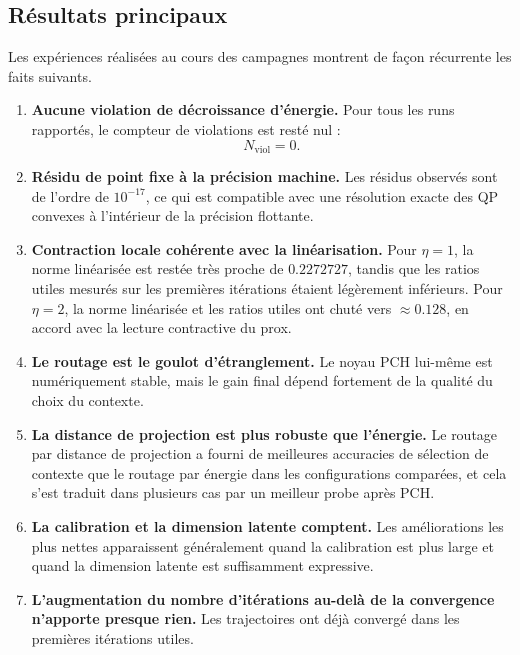\documentclass[11pt,a4paper]{article}
\newcommand{\1}{\mathbf 1}
\begin{document}
\subsection{Résultats principaux}

Les expériences réalisées au cours des campagnes montrent de façon récurrente les faits suivants.

\begin{enumerate}[leftmargin=2em]
    \item \textbf{Aucune violation de décroissance d’énergie.}
    Pour tous les runs rapportés, le compteur de violations est resté nul :
    \[
    N_{\mathrm{viol}} = 0.
    \]

    \item \textbf{Résidu de point fixe à la précision machine.}
    Les résidus observés sont de l’ordre de \(10^{-17}\), ce qui est compatible avec une résolution exacte des QP convexes à l’intérieur de la précision flottante.

    \item \textbf{Contraction locale cohérente avec la linéarisation.}
    Pour \(\eta=1\), la norme linéarisée est restée très proche de \(0.2272727\), tandis que les ratios utiles mesurés sur les premières itérations étaient légèrement inférieurs.
    Pour \(\eta=2\), la norme linéarisée et les ratios utiles ont chuté vers \(\approx 0.128\), en accord avec la lecture contractive du prox.

    \item \textbf{Le routage est le goulot d’étranglement.}
    Le noyau PCH lui-même est numériquement stable, mais le gain final dépend fortement de la qualité du choix du contexte.

    \item \textbf{La distance de projection est plus robuste que l’énergie.}
    Le routage par distance de projection a fourni de meilleures accuracies de sélection de contexte que le routage par énergie dans les configurations comparées, et cela s’est traduit dans plusieurs cas par un meilleur probe après PCH.

    \item \textbf{La calibration et la dimension latente comptent.}
    Les améliorations les plus nettes apparaissent généralement quand la calibration est plus large et quand la dimension latente est suffisamment expressive.

    \item \textbf{L’augmentation du nombre d’itérations au-delà de la convergence n’apporte presque rien.}
    Les trajectoires ont déjà convergé dans les premières itérations utiles.


\end{enumerate}
\end{document}
